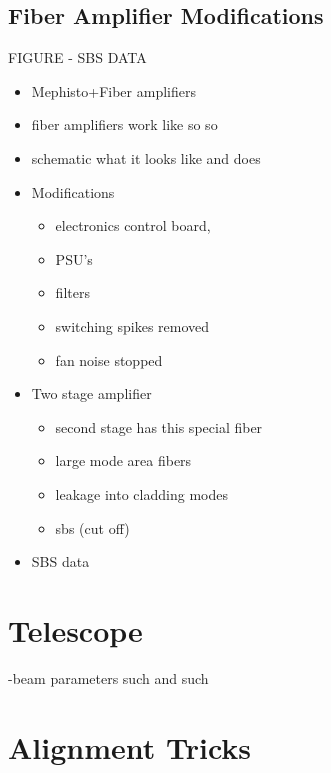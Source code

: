 \documentclass[twocolumn,aps,pra,showpacs,preprintnumbers,bibnotes]{revtex4-1}
\begin{document}
\subsection{Fiber Amplifier Modifications}
FIGURE - SBS DATA
\begin{itemize}
	\item Mephisto+Fiber amplifiers
\item fiber amplifiers work like so so
\item schematic what it looks like and does
\item Modifications
	\begin{itemize}
		\item electronics control board,
		\item PSU's
		\item filters
		\item switching spikes removed
		\item fan noise stopped
	\end{itemize}
\item Two stage amplifier
	\begin{itemize}
		\item second stage has this special fiber 
		\item large mode area fibers
		\item leakage into cladding modes 
		\item sbs (cut off)
	\end{itemize}
\item SBS data
\end{itemize}
\section{Telescope}
-beam parameters such and such

\section{Alignment Tricks}
\end{document}
